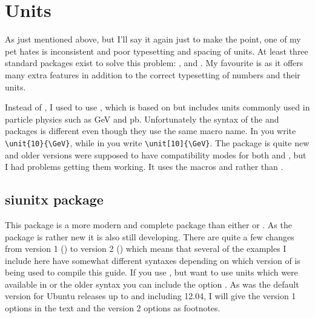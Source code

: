 \section{Units}
\label{sec:tips:units}

As just mentioned above, but I'll say it again just to make the point,
one of my pet hates is inconsistent and poor typesetting and spacing
of units. At least three standard packages exist to solve this
problem: ,  and . My
favourite is  as it offers many extra features in
addition to the correct typesetting of numbers and their units.

Instead of , I used to use , which
is based on  but includes units commonly used in
particle physics such as \si{\GeV} and \si{\pico\barn}. Unfortunately
the syntax of the  and  packages is
different even though they use the same macro name. In
 you write \verb+\unit{10}{\GeV}+, while in
 you write \verb+\unit[10]{\GeV}+. The
 package is quite new and older versions were
supposed to have compatibility modes for both  and
, but I had problems getting them working. It uses the
macros  and  rather than .


\subsection{siunitx package}
\label{sec:tips:siunitx}

This package is a more modern and complete package than either
 or . As the package is rather new it
is also still developing. There are quite a few changes from version 1
() to version 2 () which means that several of the
examples I include here have somewhat different syntaxes depending on
which version of \TeXLive is being used to compile this guide. If you
use , but want to use units which were available in
 or the older syntax you can include the option
. As  was the default
version for Ubuntu releases up to and including
12.04, I will give the  version 1
options in the text and the version 2 options as footnotes.

